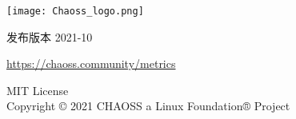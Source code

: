 \begin{titlepage}
    \begin{center}
        \vspace*{1.5cm}
            
        \texttt{[image: Chaoss\_logo.png]}
        
	\vspace{2cm}


        \vspace{1cm}
        \Huge
        发布版本 2021-10
            
        \vspace{1.5cm}
        
	\LARGE
	    \url{https://chaoss.community/metrics}
            
        \vfill
            
        \Large
        MIT License\\
        Copyright © 2021 CHAOSS a Linux Foundation® Project\\
            
    \end{center}
\end{titlepage}

\thispagestyle{empty}
